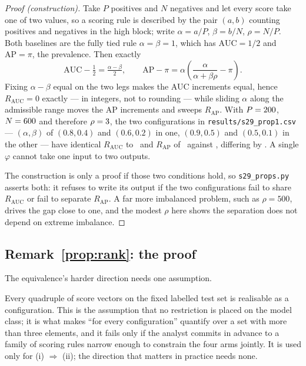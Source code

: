 \begin{proof}[Proof (construction)]
Take $P$ positives and $N$ negatives and let every score take one of two
values, so a scoring rule is described by the pair $(a,b)$ counting positives
and negatives in the high block; write $\alpha = a/P$, $\beta = b/N$,
$\rho = N/P$. Both baselines are the fully tied rule $\alpha = \beta = 1$,
which has $\mathrm{AUC} = 1/2$ and $\mathrm{AP} = \pi$, the prevalence. Then
exactly
\[
\mathrm{AUC} - \tfrac12 = \tfrac{\alpha - \beta}{2},
\qquad
\mathrm{AP} - \pi = \alpha\left(\frac{\alpha}{\alpha + \beta\rho} - \pi\right).
\]
Fixing $\alpha - \beta$ equal on the two legs makes the AUC increments equal,
hence $R_{\mathrm{AUC}} = 0$ exactly --- in integers, not to rounding ---
while sliding $\alpha$ along the admissible range moves the AP increments and
sweeps $R_{\mathrm{AP}}$. With $P = 200$, $N = 600$ and therefore
$\rho = 3$, the two configurations in
\texttt{results/s29\_prop1.csv} --- $(\alpha,\beta)$ of $(0.8, 0.4)$ and
$(0.6, 0.2)$ in one, $(0.9, 0.5)$ and $(0.5, 0.1)$ in the other --- have
identical $R_{\mathrm{AUC}}$ to \propOneAucGap\ and $R_{\mathrm{AP}}$ of
\propOneRapA\ against \propOneRapB, differing by \propOneApGap. A single
$\varphi$ cannot take one input to two outputs.

The construction is only a proof if those two conditions hold, so
\texttt{s29\_props.py} asserts both: it refuses to write its output if the two
configurations fail to share $R_{\mathrm{AUC}}$ or fail to separate
$R_{\mathrm{AP}}$. A far more imbalanced problem, such as $\rho = 500$, drives the
gap close to one, and the modest
$\rho$ here shows the separation does not depend on extreme imbalance.
\end{proof}

\subsection*{Remark~\ref{prop:rank}: the proof}

The equivalence's harder direction needs one assumption.

\begin{assumption}[Richness]
\label{ass:rich}
Every quadruple of score vectors on the fixed labelled test set is realisable
as a configuration. This is the assumption that no restriction is placed on
the model class; it is what makes ``for every configuration'' quantify over a
set with more than three elements, and it fails only if the analyst commits in
advance to a family of scoring rules narrow enough to constrain the four arms
jointly. It is used only for (i) $\Rightarrow$ (ii); the direction that
matters in practice needs none.
\end{assumption}

